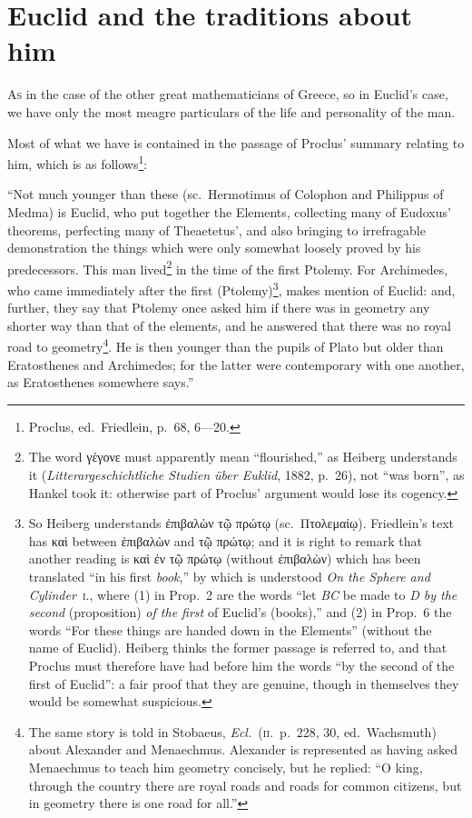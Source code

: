 \chapter[Euclid and traditions about him]{Euclid and the traditions about him}

\textsc{As} in the case of the other great mathematicians of Greece, so in Euclid's case, we have only the most meagre particulars of the life and personality of the man.

Most of what we have is contained in the passage of Proclus' summary relating to him, which is as follows\footnote{Proclus, ed.~Friedlein, p.~68, 6---20.}:

``Not much younger than these (sc.~Hermotimus of Colophon and Philippus of Medma) is Euclid, who put together the Elements, collecting many of Eudoxus' theorems, perfecting many of Theaetetus', and also bringing to irrefragable demonstration the things which were only somewhat loosely proved by his predecessors. This man lived\footnote{The word γέγονε must apparently mean ``flourished,'' as Heiberg understands it (\emph{Litterargeschichtliche Studien über Euklid}, 1882, p.~26), not ``was born'', as Hankel took it: otherwise part of Proclus' argument would lose its cogency.} in the time of the first Ptolemy. For Archimedes, who came immediately after the first (Ptolemy)\footnote{So Heiberg understands ἐπιβαλὼν τῷ πρώτῳ (sc.~Πτολεμαίῳ). Friedlein's text has καὶ between ἐπιβαλὼν and τῷ πρώτῳ; and it is right to remark that another reading is καὶ ἐν τῷ πρώτῳ (without ἐπιβαλὼν) which has been translated ``in his first \emph{book},'' by which is understood \emph{On the Sphere and Cylinder}~\textsc{i.}, where (1) in Prop.~2 are the words ``let \emph{BC} be made to \emph{D by the second} (proposition) \emph{of the first} of Euclid's (books),'' and (2) in Prop.~6 the words ``For these things are handed down in the Elements'' (without the name of Euclid). Heiberg thinks the former passage is referred to, and that Proclus must therefore have had before him the words ``by the second of the first of Euclid'': a fair proof that they are genuine, though in themselves they would be somewhat suspicious.}, makes mention of Euclid: and, further, they say that Ptolemy once asked him if there was in geometry any shorter way than that of the elements, and he answered that there was no royal road to geometry\footnote{The same story is told in Stobaeus, \emph{Ecl.}~(\textsc{ii.}~p.~228, 30, ed.~Wachsmuth) about Alexander and Menaechmus. Alexander is represented as having asked Menaechmus to teach him geometry concisely, but he replied: ``O king, through the country there are royal roads and roads for common citizens, but in geometry there is one road for all.''}. He is then younger than the pupils of Plato but older than Eratosthenes and Archimedes; for the latter were contemporary with one another, as Eratosthenes somewhere says.''

